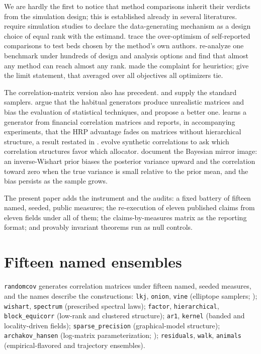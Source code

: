 \documentclass[11pt]{article}
\begin{document}
We are hardly the first to notice that method comparisons inherit their
verdicts from the simulation design; this is established already in
several literatures. \citet{morris2019} require simulation studies to
declare the data-generating mechanism as a design choice of equal rank
with the estimand. \citet{boulesteix2013} trace the over-optimism of
self-reported comparisons to test beds chosen by the method's own
authors. \citet{niessl2022} re-analyze one benchmark under hundreds of
design and analysis options and find that almost any method can reach
almost any rank. \citet{hooker1995} made the complaint for heuristics;
\citet{wolpert1997} give the limit statement, that averaged over all
objectives all optimizers tie.

The correlation-matrix version also has precedent.
\citet{joe2006} and \citet{lkj2009} supply the standard samplers.
\citet{hardin2013} argue that the habitual generators produce unrealistic
matrices and bias the evaluation of statistical techniques, and propose a
better one. \citet{marti2020} learns a generator from financial
correlation matrices and reports, in accompanying experiments, that the
HRP advantage fades on matrices without hierarchical
structure, a result restated in \citet{marti2021}.
\citet{papenbrock2021} evolve synthetic correlations to ask which
correlation structures favor which allocator. \citet{alvarez2014} document the Bayesian
mirror image: an inverse-Wishart prior biases the posterior variance upward
and the correlation toward zero when the true variance is small relative to
the prior mean, and the bias persists as the sample grows.

The present paper adds the instrument and the audits: a fixed
battery of fifteen named, seeded, public measures; the re-execution of
eleven published claims from eleven fields under all of them; the
claims-by-measures matrix as the reporting format; and provably invariant
theorems run as null controls.

\section{Fifteen named ensembles}

\texttt{randomcov} generates correlation matrices under fifteen named,
seeded measures, and the names describe the constructions:
\texttt{lkj}, \texttt{onion}, \texttt{vine} (elliptope samplers;
\citealp{joe2006,lkj2009}); \texttt{wishart}, \texttt{spectrum}
(prescribed spectral laws); \texttt{factor}, \texttt{hierarchical},
\texttt{block\_equicorr} (low-rank and clustered structure); \texttt{ar1},
\texttt{kernel} (banded and locality-driven fields);
\texttt{sparse\_precision} (graphical-model structure);
\texttt{archakov\_hansen} (log-matrix parameterization;
\citealp{archakov2021});
\texttt{residuals}, \texttt{walk}, \texttt{animals} (empirical-flavored
and trajectory ensembles).
\end{document}
